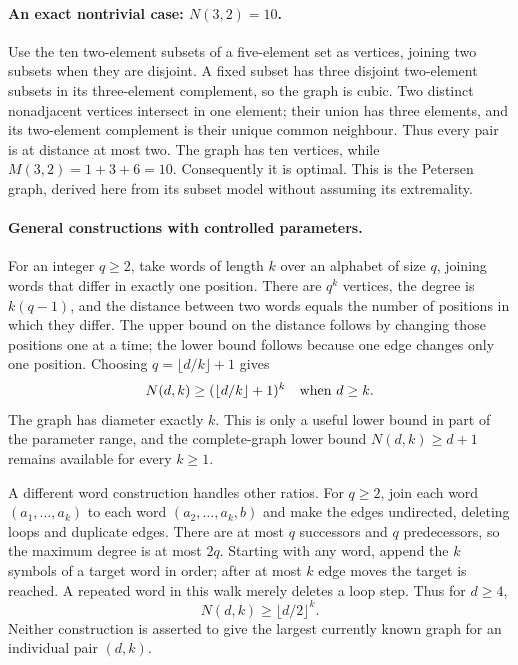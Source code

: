 \documentclass[11pt,a4paper]{article}
\begin{document}
\paragraph{An exact nontrivial case: $N(3,2)=10$.}
Use the ten two-element subsets of a five-element set as vertices,
joining two subsets when they are disjoint. A fixed subset has three
disjoint two-element subsets in its three-element complement, so the
graph is cubic. Two distinct nonadjacent vertices intersect in one
element; their union has three elements, and its two-element complement
is their unique common neighbour. Thus every pair is at distance at
most two. The graph has ten vertices, while $M(3,2)=1+3+6=10$.
Consequently it is optimal. This is the Petersen graph, derived here
from its subset model without assuming its extremality.

\paragraph{General constructions with controlled parameters.}
For an integer $q\ge2$, take words of length $k$ over an alphabet of
size $q$, joining words that differ in exactly one position. There
are $q^k$ vertices, the degree is $k(q-1)$, and the distance between
two words equals the number of positions in which they differ.
The upper bound on the distance follows by changing those positions
one at a time; the lower bound follows because one edge changes only
one position. Choosing $q=\lfloor d/k\rfloor+1$ gives
\[
                N(d,k)\ge (\lfloor d/k\rfloor+1)^k
                \quad\hbox{when }d\ge k.
\]
The graph has diameter exactly $k$. This is only a useful lower bound
in part of the parameter range, and the complete-graph lower bound
$N(d,k)\ge d+1$ remains available for every $k\ge1$.

A different word construction handles other ratios. For $q\ge2$,
join each word $(a_1,\ldots,a_k)$ to each word
$(a_2,\ldots,a_k,b)$ and make the edges undirected, deleting loops
and duplicate edges. There are at most $q$ successors and $q$
predecessors, so the maximum degree is at most $2q$. Starting with
any word, append the $k$ symbols of a target word in order; after
at most $k$ edge moves the target is reached. A repeated word in this
walk merely deletes a loop step. Thus for $d\ge4$,
\[
                       N(d,k)\ge\lfloor d/2\rfloor^k.
\]
Neither construction is asserted to give the largest currently known
graph for an individual pair $(d,k)$.
\end{document}
